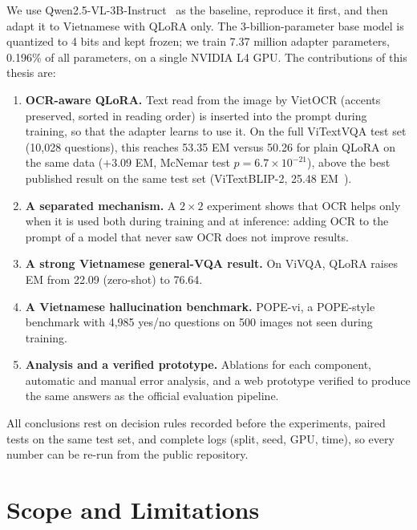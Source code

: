 We use Qwen2.5-VL-3B-Instruct~\cite{bai2025qwen25vl} as the baseline, reproduce
it first, and then adapt it to Vietnamese with QLoRA only. The 3-billion-parameter
base model is quantized to 4 bits and kept frozen; we train 7.37 million adapter
parameters, 0.196\% of all parameters, on a single NVIDIA L4 GPU. The
contributions of this thesis are:

\begin{enumerate}
  \item \textbf{OCR-aware QLoRA.} Text read from the image by VietOCR (accents
  preserved, sorted in reading order) is inserted into the prompt during
  training, so that the adapter learns to use it. On the full ViTextVQA test set
  (10,028 questions), this reaches 53.35 EM versus 50.26 for plain QLoRA on the
  same data ($+3.09$ EM, McNemar test $p = 6.7\times10^{-21}$), above the best
  published result on the same test set (ViTextBLIP-2, 25.48
  EM~\cite{nguyen2024vitextvqa}).
  \item \textbf{A separated mechanism.} A $2\times2$ experiment shows that OCR
  helps only when it is used both during training and at inference: adding OCR
  to the prompt of a model that never saw OCR does not improve results.
  \item \textbf{A strong Vietnamese general-VQA result.} On ViVQA, QLoRA raises
  EM from 22.09 (zero-shot) to 76.64.
  \item \textbf{A Vietnamese hallucination benchmark.} POPE-vi, a POPE-style
  benchmark with 4,985 yes/no questions on 500 images not seen during training.
  \item \textbf{Analysis and a verified prototype.} Ablations for each component,
  automatic and manual error analysis, and a web prototype verified to produce
  the same answers as the official evaluation pipeline.
\end{enumerate}

All conclusions rest on decision rules recorded before the experiments, paired
tests on the same test set, and complete logs (split, seed, GPU, time), so every
number can be re-run from the public repository.

\section{Scope and Limitations}
\label{sec:intro-scope}

